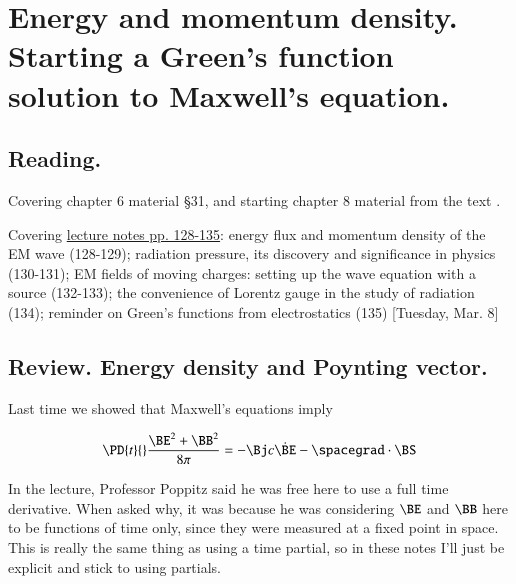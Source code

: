 %
%

\chapter{Energy and momentum density.  Starting a Green's function solution to Maxwell's equation.}
\label{chap:relativisticElectrodynamicsL17}
{}
\date{Mar 8, 2011}

\beginArtNoToc

\section{Reading.}

Covering chapter 6 material \S 31, and starting chapter 8 material from the text \citep{landau1980classical}.

Covering \href{http://www.physics.utoronto.ca/~poppitz/epoppitz/PHY450_files/RelEMpp128-135.pdf}{lecture notes pp. 128-135}: energy flux and momentum density of the EM wave (128-129); radiation pressure, its discovery and significance in physics (130-131); EM fields of moving charges: setting up the wave equation with a source (132-133); the convenience of Lorentz gauge in the study of radiation (134); reminder on Green's functions from electrostatics (135) [Tuesday, Mar. 8] 

\section{Review.  Energy density and Poynting vector.}

Last time we showed that Maxwell's equations imply

\begin{equation}\label{eqn:relativisticElectrodynamicsL17:10}
\PD{t}{} \frac{\BE^2 + \BB^2 }{8 \pi} = -\Bj c\dot \BE - \spacegrad \cdot \BS
\end{equation}

In the lecture, Professor Poppitz said he was free here to use a full time derivative.  When asked why, it was because he was considering $\BE$ and $\BB$ here to be functions of time only, since they were measured at a fixed point in space.  This is really the same thing as using a time partial, so in these notes I'll just be explicit and stick to using partials.

